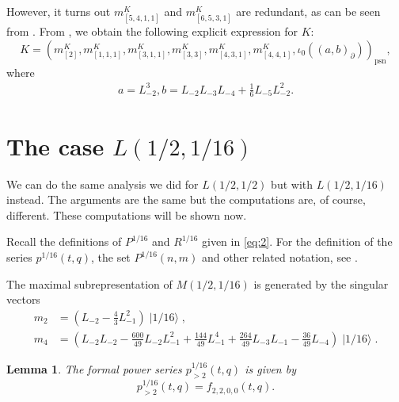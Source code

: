 \documentclass[a4paper, 12pt, reqno]{amsart}
\newtheorem{lemma}[theorem]{Lemma}
\theoremstyle{remark}
\DeclareMathOperator{\psn}{psn}
\DeclareMathOperator{\vacsixteen}{|1/16\rangle}
\begin{document}
However, it turns out $m^K_{[5, 4, 1, 1]}$ and $m^K_{[6, 5, 3, 1]}$ are redundant, as can be seen from \cite[m11-m15.ipynb]{sagemath2}.
From \cite[Theorem 2]{andrews_singular_2022}, we obtain the following explicit expression for $K$:
\begin{equation*}
  K = (m^K_{[2]}, m^K_{[1, 1, 1]}, m^K_{[3, 1, 1]}, m^K_{[3, 3]}, m^K_{[4, 3, 1]}, m^K_{[4, 4, 1]}, \iota_0((a, b)_\partial))_{\psn},
\end{equation*}
where
\begin{align*}
  a = L_{-2}^3, b = L_{-2}L_{-3}L_{-4} + \tfrac{1}{6}L_{-5}L_{-2}^2.
\end{align*}

\section{The case $L(1/2, 1/16)$}
\label{sec:case-l12-116}

We can do the same analysis we did for $L(1/2, 1/2)$ but with $L(1/2, 1/16)$ instead.
The arguments are the same but the computations are, of course, different.
These computations will be shown now.

Recall the definitions of $P^{1/16}$ and $R^{1/16}$ given in \eqref{eq:2}.
For the definition of the series $p^{1/16}(t, q)$, the set $P^{1/16}(n, m)$ and other related notation, see .

The maximal subrepresentation of $M(1/2, 1/16)$ is generated by the singular vectors
\begin{align*}
  m_2 &= (L_{-2} - \tfrac{4}{3} L_{-1}^2)\vacsixteen, \\
  m_4 &= (L_{-2}L_{-2} - \tfrac{600}{49}L_{-2}L_{-1}^2 + \tfrac{144}{49}L_{-1}^4 + \tfrac{264}{49}L_{-3}L_{-1} - \tfrac{36}{49}L_{-4})\vacsixteen.
\end{align*}

\begin{lemma}
  \label{lmm:12}
  The formal power series $p^{1/16}_{>2}(t, q)$ is given by
  \begin{equation*}
    p^{1/16}_{>2}(t, q) = f_{2, 2, 0, 0}(t, q).
  \end{equation*}
\end{lemma}
\end{document}
